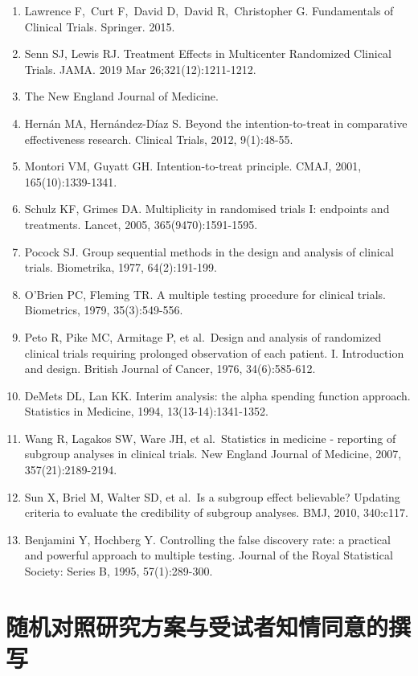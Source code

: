 \documentclass[
  chinese-hans,
  letterpaper,
  DIV=11,
  numbers=noendperiod]{scrreprt}
\begin{document}
\begin{enumerate}
\def\labelenumi{\arabic{enumi}.}
\item
  Lawrence F,~Curt F,~David D,~David R,~Christopher G. Fundamentals of
  Clinical Trials. Springer. 2015.
\item
  Senn SJ, Lewis RJ. Treatment Effects in Multicenter Randomized
  Clinical Trials. JAMA. 2019 Mar 26;321(12):1211-1212.
\item
  The New England Journal of Medicine.
\item
  Hernán MA, Hernández-Díaz S. Beyond the intention-to-treat in
  comparative effectiveness research. Clinical Trials, 2012, 9(1):48-55.
\item
  Montori VM, Guyatt GH. Intention-to-treat principle. CMAJ, 2001,
  165(10):1339-1341.
\item
  Schulz KF, Grimes DA. Multiplicity in randomised trials I: endpoints
  and treatments. Lancet, 2005, 365(9470):1591-1595.
\item
  Pocock SJ. Group sequential methods in the design and analysis of
  clinical trials. Biometrika, 1977, 64(2):191-199.
\item
  O'Brien PC, Fleming TR. A multiple testing procedure for clinical
  trials. Biometrics, 1979, 35(3):549-556.
\item
  Peto R, Pike MC, Armitage P, et al.~Design and analysis of randomized
  clinical trials requiring prolonged observation of each patient. I.
  Introduction and design. British Journal of Cancer, 1976,
  34(6):585-612.
\item
  DeMets DL, Lan KK. Interim analysis: the alpha spending function
  approach. Statistics in Medicine, 1994, 13(13-14):1341-1352.
\item
  Wang R, Lagakos SW, Ware JH, et al.~Statistics in medicine - reporting
  of subgroup analyses in clinical trials. New England Journal of
  Medicine, 2007, 357(21):2189-2194.
\item
  Sun X, Briel M, Walter SD, et al.~Is a subgroup effect believable?
  Updating criteria to evaluate the credibility of subgroup analyses.
  BMJ, 2010, 340:c117.
\item
  Benjamini Y, Hochberg Y. Controlling the false discovery rate: a
  practical and powerful approach to multiple testing. Journal of the
  Royal Statistical Society: Series B, 1995, 57(1):289-300.
\end{enumerate}


\chapter{随机对照研究方案与受试者知情同意的撰写}\label{ux968fux673aux5bf9ux7167ux7814ux7a76ux65b9ux6848ux4e0eux53d7ux8bd5ux8005ux77e5ux60c5ux540cux610fux7684ux64b0ux5199}
\end{document}
